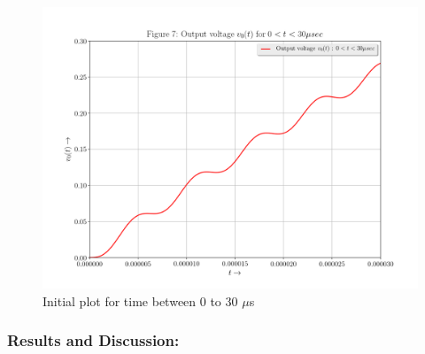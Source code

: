 \documentclass[11pt, a4paper]{article}
\begin{document}
\begin{figure}[!tbh]

  \centering
\includegraphics[scale=0.5]{./../Extras/A67.png}  %


\caption{Initial plot for time between 0 to 30 $\mu$s}
\end{figure}
\newpage
\subsubsection{Results and Discussion:}\label{results-and-discussion}
\end{document}
